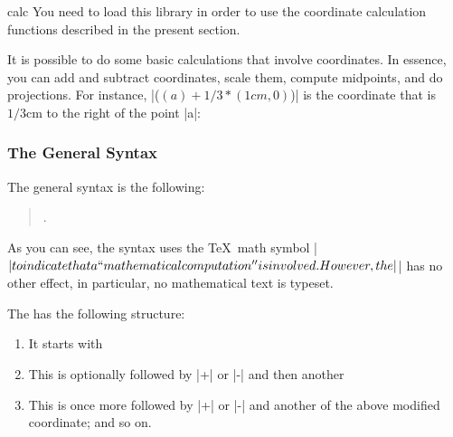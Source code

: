 \begin{tikzlibrary}{calc}
    You need to load this library in order to use the coordinate calculation
    functions described in the present section.
\end{tikzlibrary}

It is possible to do some basic calculations that involve coordinates. In
essence, you can add and subtract coordinates, scale them, compute midpoints,
and do projections. For instance, |($(a) + 1/3*(1cm,0)$)| is the coordinate
that is $1/3 \text{cm}$ to the right of the point |a|:
%
\begin{codeexample}[]
\end{codeexample}


\subsubsection{The General Syntax}

The general syntax is the following:
%
\begin{quote}
    .
\end{quote}

As you can see, the syntax uses the \TeX\ math symbol |$| to %
indicate that a ``mathematical computation'' is involved. However, the |$| %
has no other effect, in particular, no mathematical text is typeset.

The  has the following structure:
%
\begin{enumerate}
    \item It starts with
        \begin{quote}
        \end{quote}
    \item This is optionally followed by |+| or |-| and then another
        \begin{quote}
        \end{quote}
    \item This is once more followed by |+| or |-| and another of the above
        modified coordinate; and so on.
\end{enumerate}

